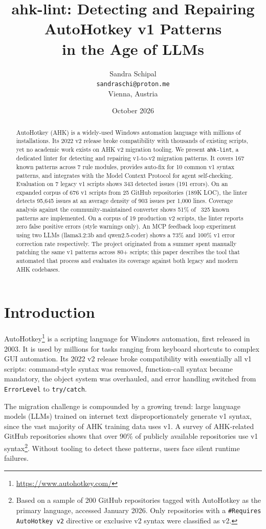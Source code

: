 \documentclass[11pt,a4paper]{article}
\title{ahk-lint: Detecting and Repairing AutoHotkey v1 Patterns \\ in the Age of LLMs}
\author{Sandra Schipal \\ \texttt{sandraschi@proton.me} \\ Vienna, Austria}
\date{October 2026}
\begin{document}
\maketitle

\begin{abstract}
AutoHotkey (AHK) is a widely-used Windows automation language with millions of installations. Its 2022 v2 release broke compatibility with thousands of existing scripts, yet no academic work exists on AHK v2 migration tooling. We present \texttt{ahk-lint}, a dedicated linter for detecting and repairing v1-to-v2 migration patterns. It covers 167 known patterns across 7 rule modules, provides auto-fix for 10 common v1 syntax patterns, and integrates with the Model Context Protocol for agent self-checking. Evaluation on 7 legacy v1 scripts shows 343 detected issues (191 errors). On an expanded corpus of 676 v1 scripts from 25 GitHub repositories (189K LOC), the linter detects 95,645 issues at an average density of 903 issues per 1,000 lines. Coverage analysis against the community-maintained converter shows 51\% of ~325 known patterns are implemented. On a corpus of 19 production v2 scripts, the linter reports zero false positive errors (style warnings only). An MCP feedback loop experiment using two LLMs (llama3.2:3b and qwen2.5-coder) shows a 73\% and 100\% v1 error correction rate respectively. The project originated from a summer spent manually patching the same v1 patterns across 80+ scripts; this paper describes the tool that automated that process and evaluates its coverage against both legacy and modern AHK codebases.
\end{abstract}

\section{Introduction}

AutoHotkey\footnote{\url{https://www.autohotkey.com/}} is a scripting language for Windows automation, first released in 2003. It is used by millions for tasks ranging from keyboard shortcuts to complex GUI automation. Its 2022 v2 release broke compatibility with essentially all v1 scripts: command-style syntax was removed, function-call syntax became mandatory, the object system was overhauled, and error handling switched from \texttt{ErrorLevel} to \texttt{try/catch}.

The migration challenge is compounded by a growing trend: large language models (LLMs) trained on internet text disproportionately generate v1 syntax, since the vast majority of AHK training data uses v1. A survey of AHK-related GitHub repositories shows that over 90\% of publicly available repositories use v1 syntax\footnote{Based on a sample of 200 GitHub repositories tagged with AutoHotkey as the primary language, accessed January 2026. Only repositories with a \texttt{\#Requires AutoHotkey v2} directive or exclusive v2 syntax were classified as v2.}. Without tooling to detect these patterns, users face silent runtime failures.
\end{document}
